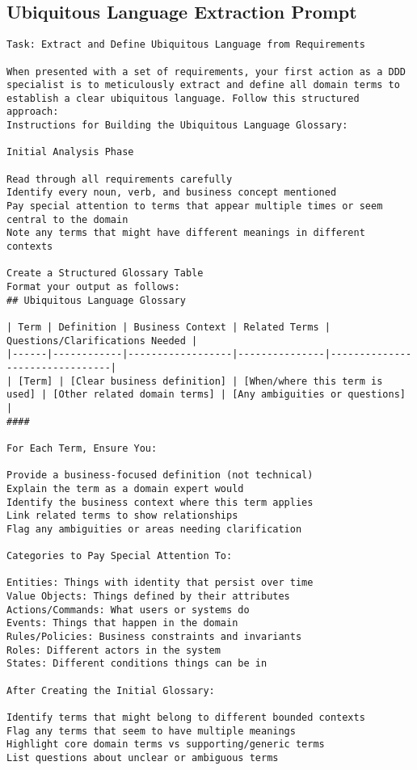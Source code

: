 \subsection{Ubiquitous Language Extraction Prompt}\label{app:ubiquitous-language-prompt}
\begin{verbatim}
Task: Extract and Define Ubiquitous Language from Requirements

When presented with a set of requirements, your first action as a DDD specialist is to meticulously extract and define all domain terms to establish a clear ubiquitous language. Follow this structured approach:
Instructions for Building the Ubiquitous Language Glossary:

Initial Analysis Phase

Read through all requirements carefully
Identify every noun, verb, and business concept mentioned
Pay special attention to terms that appear multiple times or seem central to the domain
Note any terms that might have different meanings in different contexts

Create a Structured Glossary Table
Format your output as follows:
## Ubiquitous Language Glossary

| Term | Definition | Business Context | Related Terms | Questions/Clarifications Needed |
|------|------------|------------------|---------------|--------------------------------|
| [Term] | [Clear business definition] | [When/where this term is used] | [Other related domain terms] | [Any ambiguities or questions] |
####

For Each Term, Ensure You:

Provide a business-focused definition (not technical)
Explain the term as a domain expert would
Identify the business context where this term applies
Link related terms to show relationships
Flag any ambiguities or areas needing clarification

Categories to Pay Special Attention To:

Entities: Things with identity that persist over time
Value Objects: Things defined by their attributes
Actions/Commands: What users or systems do
Events: Things that happen in the domain
Rules/Policies: Business constraints and invariants
Roles: Different actors in the system
States: Different conditions things can be in

After Creating the Initial Glossary:

Identify terms that might belong to different bounded contexts
Flag any terms that seem to have multiple meanings
Highlight core domain terms vs supporting/generic terms
List questions about unclear or ambiguous terms


\end{verbatim}
